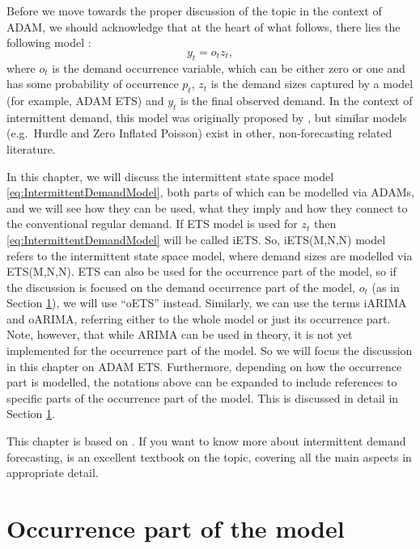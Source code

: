 \documentclass[]{book}
\theoremstyle{definition}
\theoremstyle{definition}
\theoremstyle{definition}
\theoremstyle{definition}
\theoremstyle{remark}
\begin{document}
Before we move towards the proper discussion of the topic in the context of ADAM, we should acknowledge that at the heart of what follows, there lies the following model \citep{Croston1972}:
\begin{equation}
y_t = o_t z_t ,
\label{eq:IntermittentDemandModel}
\end{equation}
where \(o_t\) is the demand occurrence variable, which can be either zero or one and has some probability of occurrence \(p_t\), \(z_t\) is the demand sizes captured by a model (for example, ADAM ETS) and \(y_t\) is the final observed demand. In the context of intermittent demand, this model was originally proposed by \citet{Croston1972}, but similar models (e.g.~Hurdle and Zero Inflated Poisson) exist in other, non-forecasting related literature.

In this chapter, we will discuss the intermittent state space model \eqref{eq:IntermittentDemandModel}, both parts of which can be modelled via ADAMs, and we will see how they can be used, what they imply and how they connect to the conventional regular demand. If ETS model is used for \(z_t\) then \eqref{eq:IntermittentDemandModel} will be called iETS. So, iETS(M,N,N) model refers to the intermittent state space model, where demand sizes are modelled via ETS(M,N,N). ETS can also be used for the occurrence part of the model, so if the discussion is focused on the demand occurrence part of the model, \(o_t\) (as in Section \ref{ADAMOccurrence}), we will use ``oETS'' instead. Similarly, we can use the terms iARIMA and oARIMA, referring either to the whole model or just its occurrence part. Note, however, that while ARIMA can be used in theory, it is not yet implemented for the occurrence part of the model. So we will focus the discussion in this chapter on ADAM ETS. Furthermore, depending on how the occurrence part is modelled, the notations above can be expanded to include references to specific parts of the occurrence part of the model. This is discussed in detail in Section \ref{ADAMOccurrence}.

This chapter is based on \citet{Svetunkov2019a}. If you want to know more about intermittent demand forecasting, \citet{BoylanSyntetos2021} is an excellent textbook on the topic, covering all the main aspects in appropriate detail.

\hypertarget{ADAMOccurrence}{%
\section{Occurrence part of the model}\label{ADAMOccurrence}}
\end{document}
